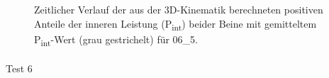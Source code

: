 \documentclass[
  letterpaper,
  DIV=11]{scrartcl}
\makeatletter
\let\oldparagraph\paragraph
\renewcommand{\paragraph}{
    \@ifstar
      \xxxParagraphStar
      \xxxParagraphNoStar
  }
\newcommand{\xxxParagraphStar}[1]{\oldparagraph*{#1}\mbox{}}
\newcommand{\xxxParagraphNoStar}[1]{\oldparagraph{#1}\mbox{}}
\makeatother
\begin{document}
\begin{figure}


\caption{\label{fig-PInt_Kinematik_06_5}Zeitlicher Verlauf der aus der
3D-Kinematik berechneten positiven Anteile der inneren Leistung
(P\textsubscript{int}) beider Beine mit gemitteltem
P\textsubscript{int}-Wert (grau gestrichelt) für 06\_5.}

\end{figure}%

\paragraph{Test 6}
\end{document}

